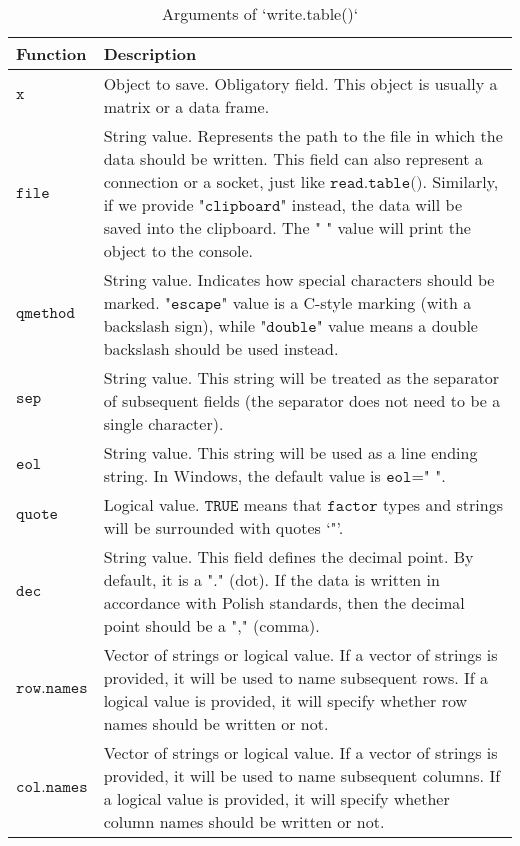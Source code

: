 \documentclass[]{book}
\theoremstyle{definition}
\theoremstyle{definition}
\theoremstyle{definition}
\theoremstyle{remark}
\begin{document}
\begin{table}

\caption{\label{tab:tab03}Arguments of `write.table()`}
\centering
\begin{tabular}[t]{>{}l||>{\raggedright\arraybackslash}p{35em}}
\hline
Function & Description\\
\hline
$\texttt{x}$ & Object to save. Obligatory field. This object is usually a matrix or a data frame.\\
\hline
$\texttt{file}$ & String value. Represents the path to the file in which the data should be written. This field can also represent a connection or a socket, just like $\texttt{read.table()}$. Similarly, if we provide $\texttt{"clipboard"}$ instead, the data will be saved into the clipboard. The " " value will print the object to the console.\\
\hline
$\texttt{qmethod}$ & String value. Indicates how special characters should be marked. $\texttt{"escape"}$ value is a C-style marking (with a backslash sign), while $\texttt{"double"}$ value means a double backslash should be used instead.\\
\hline
$\texttt{sep}$ & String value. This string will be treated as the separator of subsequent fields (the separator does not need to be a single character).\\
\hline
$\texttt{eol}$ & String value. This string will be used as a line ending string. In Windows, the default value is $\texttt{eol="
"}$.\\
\hline
$\texttt{quote}$ & Logical value. $\texttt{TRUE}$ means that $\texttt{factor}$ types and strings will be surrounded with quotes ‘"’.\\
\hline
$\texttt{dec}$ & String value. This field defines the decimal point. By default, it is a "." (dot). If the data is written in accordance with Polish standards, then the decimal point should be a "," (comma).\\
\hline
$\texttt{row.names}$ & Vector of strings or logical value. If a vector of strings is provided, it will be used to name subsequent rows. If a logical value is provided, it will specify whether row names should be written or not.\\
\hline
$\texttt{col.names}$ & Vector of strings or logical value. If a vector of strings is provided, it will be used to name subsequent columns. If a logical value is provided, it will specify whether column names should be written or not.\\
\hline
\end{tabular}
\end{table}
\end{document}
